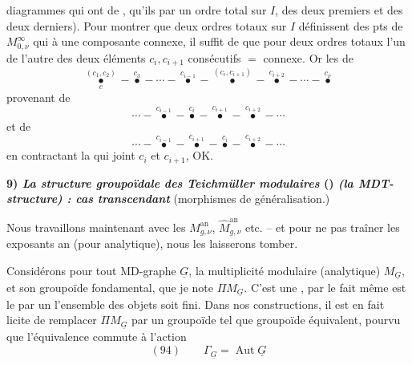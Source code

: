 \documentclass[11pt,a4paper]{article}
\begin{document}
diagrammes qui ont  de ,  qu'ils   par un ordre total sur $I$,    \struck{\ill{}}  des deux premiers et des deux derniers). Pour montrer que deux ordres totaux sur $I$ définissent \struck{\ill{}} des pts de $M^{\infty}_{0,\nu}$ qui  à une  composante connexe, il suffit de  que   pour deux ordres totaux  l'un de l'autre   des deux éléments $c_i, c_{i+1}$ consécutifs    $=$  connexe. Or les      de
\[
\overset{(c_1, c_2)}{\underset{c}{\bullet}}\!-\!\overset{c_3}{\bullet}\!-\!\cdots\!-\!\overset{c_{i-1}}{\bullet}\!-\!\overset{(c_i, c_{i+1})}{\bullet}\!-\!\overset{c_{i+2}}{\bullet}\!-\!\cdots\!-\!\overset{c_\nu}{\bullet}
\]
provenant de
\[
\cdots\!-\!\overset{c_{i-1}}{\bullet}\!-\!\overset{c_i}{\bullet}\!-\!\overset{c_{i+1}}{\bullet}\!-\!\overset{c_{i+2}}{\bullet}\!-\!\cdots
\]
et de
\[
\cdots\!-\!\overset{c_{i-1}}{\bullet}\!-\!\overset{c_{i+1}}{\bullet}\!-\!\overset{c_i}{\bullet}\!-\!\overset{c_{i+2}}{\bullet}\!-\!\cdots
\]
en contractant la \struck{\ill{}}  qui joint $c_i$ et $c_{i+1}$, OK.

\textbf{9) \emph{La structure groupoïdale des Teichmüller modulaires} () \emph{(la MDT-structure) : cas transcendant}}
(morphismes de généralisation.)

Nous travaillons maintenant avec les $M^{\mathrm{an}}_{g,\nu}$, $\widehat{M}^{\mathrm{an}}_{g,\nu}$ etc. -- et pour ne pas traîner les exposants \og an\fg{} (pour \og analytique\fg{}), nous les laisserons tomber.

Considérons pour tout MD-graphe $\underline{G}$, la multiplicité modulaire (analytique) $M_{\underline{G}}$, et son groupoïde fondamental, que je note $\Pi M_{\underline{G}}$. C'est une \og {}\fg{} , par le fait même  est   le  par un    l'ensemble des objets soit fini. Dans nos constructions, il est en fait licite de remplacer $\Pi M_{\underline{G}}$ par un groupoïde tel que   groupoïde équivalent, pourvu que \struck{\ill{}} l'équivalence commute à l'action 
\[
(94)\qquad \Gamma_{\underline{G}} = \operatorname{Aut} \underline{G}
\]
\end{document}
